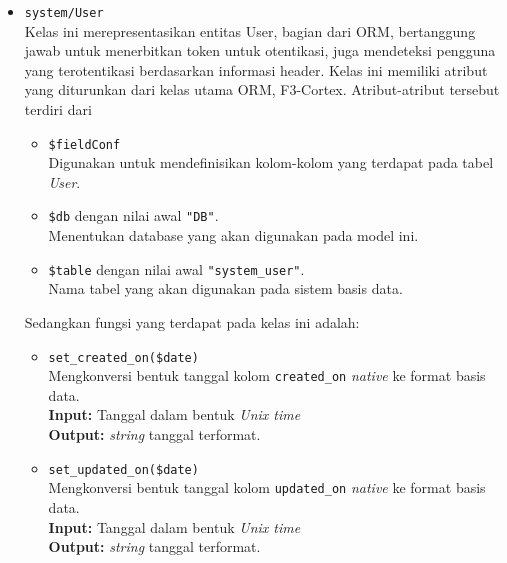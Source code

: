 \begin{itemize}
        \item \texttt{system/User} \\
            Kelas ini merepresentasikan entitas User, bagian dari ORM,
            bertanggung jawab untuk menerbitkan token untuk otentikasi, juga
            mendeteksi pengguna yang terotentikasi berdasarkan informasi header.
            Kelas ini memiliki atribut yang diturunkan dari kelas utama ORM,
            F3-Cortex. Atribut-atribut tersebut terdiri dari
            \begin{itemize}
                \item \texttt{\$fieldConf}\\
                    Digunakan untuk mendefinisikan kolom-kolom yang terdapat
                    pada tabel \textit{User}.
                \item \texttt{\$db} dengan nilai awal \texttt{"DB"}. \\
                    Menentukan database yang akan digunakan pada model ini.
                \item \texttt{\$table} dengan nilai awal
                \texttt{"system\_user"}. \\
                    Nama tabel yang akan digunakan pada sistem basis data. 
            \end{itemize}
            Sedangkan fungsi yang terdapat pada kelas ini adalah:
            \begin{itemize}
                \item \texttt{set\_created\_on(\$date)} \\
                    Mengkonversi bentuk tanggal kolom \texttt{created\_on}
                    \textit{native} ke format basis data. \\
                    \textbf{Input:} Tanggal dalam bentuk \textit{Unix time}\\
                    \textbf{Output:} \textit{string} tanggal terformat.
                
                \item \texttt{set\_updated\_on(\$date)} \\
                    Mengkonversi bentuk tanggal kolom \texttt{updated\_on}
                    \textit{native} ke format basis data. \\
                    \textbf{Input:} Tanggal dalam bentuk \textit{Unix time}\\
                    \textbf{Output:} \textit{string} tanggal terformat.
                

\end{itemize}
\end{itemize}
